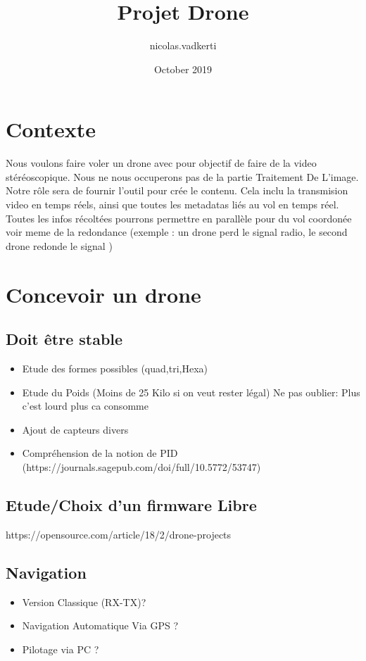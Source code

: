 \documentclass{article}
\title{Projet Drone}
\author{nicolas.vadkerti }
\date{October 2019}
\begin{document}
\maketitle
\section{Contexte}
Nous voulons faire voler un drone avec pour objectif de faire de la video stéréoscopique. Nous ne nous occuperons pas de la partie Traitement De L'image. Notre rôle sera de fournir l'outil pour crée le contenu. Cela inclu la transmision video en temps réels, ainsi que toutes les metadatas liés au vol en temps réel. Toutes les infos récoltées pourrons permettre en parallèle pour du vol coordonée voir meme de la redondance (exemple : un drone perd le signal radio, le second drone redonde le signal )  

\section{Concevoir un drone}
\subsection{Doit être stable}
\begin{itemize}
    \item Etude des formes possibles (quad,tri,Hexa)
    \item Etude du Poids (Moins de 25 Kilo si on veut rester légal) Ne pas oublier: Plus c'est lourd plus ca consomme 
    \item Ajout de capteurs divers 
    \item Compréhension de la notion de PID (https://journals.sagepub.com/doi/full/10.5772/53747)
\end{itemize}
\subsection{Etude/Choix d'un firmware Libre} https://opensource.com/article/18/2/drone-projects
\subsection{Navigation}
\begin{itemize}
    \item Version Classique (RX-TX)?
    \item Navigation Automatique Via GPS ?
    \item Pilotage via PC ? 
\end{itemize}
\end{document}
